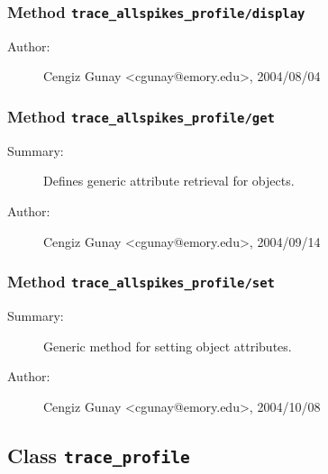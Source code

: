 \subsubsection[Method \texttt{display}]{Method \texttt{trace\_allspikes\_profile/display}}%
%
\label{ref_trace_allspikes_profile__display}%
\hypertarget{ref_trace_allspikes_profile__display}{}%
\begin{description}
%
%
%
%
%
%
%
\item[Author:]%
Cengiz Gunay <cgunay@emory.edu>, 2004/08/04
%
\end{description}
\methodline%
\subsubsection[Method \texttt{get}]{Method \texttt{trace\_allspikes\_profile/get}}%
%
\label{ref_trace_allspikes_profile__get}%
\hypertarget{ref_trace_allspikes_profile__get}{}%
\begin{description}
\item[Summary:]Defines generic attribute retrieval for objects.
%
%
%
%
%
%
%
\item[Author:]%
Cengiz Gunay <cgunay@emory.edu>, 2004/09/14
%
\end{description}
\methodline%
\subsubsection[Method \texttt{set}]{Method \texttt{trace\_allspikes\_profile/set}}%
%
\label{ref_trace_allspikes_profile__set}%
\hypertarget{ref_trace_allspikes_profile__set}{}%
\begin{description}
\item[Summary:]Generic method for setting object attributes.
%
%
%
%
%
%
%
\item[Author:]%
Cengiz Gunay <cgunay@emory.edu>, 2004/10/08
%
\end{description}
\methodline%
\subsection{Class \texttt{trace\_profile}}%
%
\label{ref_trace_profile}%
\hypertarget{ref_trace_profile}{}%
